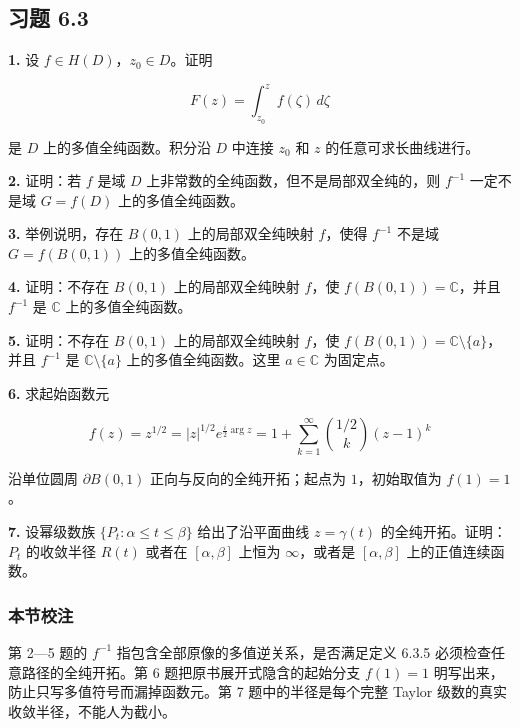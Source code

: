 \documentclass[11pt,a4paper]{article}
\begin{document}
\subsection{习题 6.3}\label{ch06-practice-heading-3}

\par{}
\noindent\textbf{1.} 设 \(f\in H(D)\)，\(z_0\in D\)。证明

\[
F(z)=\int_{z_0}^zf(\zeta)\,d\zeta
\]

是 \(D\) 上的多值全纯函数。积分沿 \(D\) 中连接 \(z_0\) 和 \(z\)
的任意可求长曲线进行。

\par{}
\noindent\textbf{2.} 证明：若 \(f\) 是域 \(D\)
上非常数的全纯函数，但不是局部双全纯的，则 \(f^{-1}\) 一定不是域
\(G=f(D)\) 上的多值全纯函数。

\par{}
\noindent\textbf{3.} 举例说明，存在 \(B(0,1)\) 上的局部双全纯映射 \(f\)，使得
\(f^{-1}\) 不是域 \(G=f(B(0,1))\) 上的多值全纯函数。

\par{}
\noindent\textbf{4.} 证明：不存在 \(B(0,1)\) 上的局部双全纯映射 \(f\)，使
\(f(B(0,1))=\mathbb C\)，并且 \(f^{-1}\) 是 \(\mathbb C\)
上的多值全纯函数。

\par{}
\noindent\textbf{5.} 证明：不存在 \(B(0,1)\) 上的局部双全纯映射 \(f\)，使
\(f(B(0,1))=\mathbb C\setminus\{a\}\)，并且 \(f^{-1}\) 是
\(\mathbb C\setminus\{a\}\) 上的多值全纯函数。这里 \(a\in\mathbb C\)
为固定点。

\par{}
\noindent\textbf{6.} 求起始函数元

\[
f(z)=z^{1/2}=|z|^{1/2}e^{\frac i2\arg z}
=1+\sum_{k=1}^{\infty}\binom{1/2}{k}(z-1)^k
\]

沿单位圆周 \(\partial B(0,1)\) 正向与反向的全纯开拓；起点为
\(1\)，初始取值为 \(f(1)=1\)。

\par{}
\noindent\textbf{7.} 设幂级数族 \(\{P_t:\alpha\le t\le\beta\}\) 给出了沿平面曲线
\(z=\gamma(t)\) 的全纯开拓。证明：\(P_t\) 的收敛半径 \(R(t)\) 或者在
\([\alpha,\beta]\) 上恒为 \(\infty\)，或者是 \([\alpha,\beta]\)
上的正值连续函数。

\subsubsection{本节校注}\label{ch06-practice-ux672cux8282ux6821ux6ce8-2}

第 2---5 题的 \(f^{-1}\) 指包含全部原像的多值逆关系，是否满足定义 6.3.5
必须检查任意路径的全纯开拓。第 6 题把原书展开式隐含的起始分支 \(f(1)=1\)
明写出来，防止只写多值符号而漏掉函数元。第 7 题中的半径是每个完整 Taylor
级数的真实收敛半径，不能人为截小。
\end{document}
